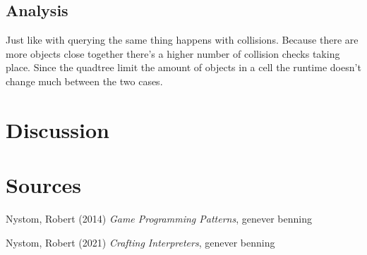 \documentclass[a4paper, 12pt]{article}
\begin{document}
\subsection{Analysis}
Just like with querying the same thing happens with collisions. Because there
are more objects close together there's a higher number of collision checks
taking place. Since the quadtree limit the amount of objects in a cell the
runtime doesn't change much between the two cases.

\section{Discussion}


\section{Sources}
Nystom, Robert (2014) \textit{Game Programming Patterns}, genever benning

Nystom, Robert (2021) \textit{Crafting Interpreters}, genever benning
\end{document}
